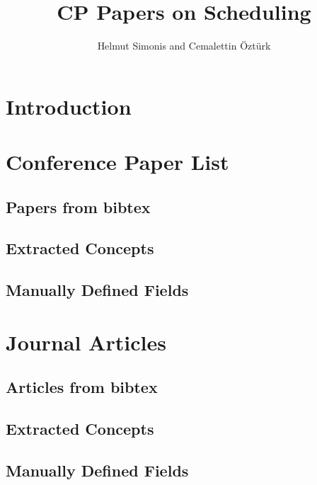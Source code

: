 \documentclass[a4paper]{article}
\title{CP Papers on Scheduling}
\author{Helmut Simonis and Cemalettin Öztürk}
\begin{document}

\maketitle
\section{Introduction}

\clearpage


\section{Conference Paper List}

\clearpage
\subsection{Papers from bibtex}


\clearpage
\subsection{Extracted Concepts}


\clearpage
\subsection{Manually Defined Fields}


\clearpage
\section{Journal Articles}

\clearpage
\subsection{Articles from bibtex}



\clearpage
\subsection{Extracted Concepts}


\clearpage
\subsection{Manually Defined Fields}

\end{document}
